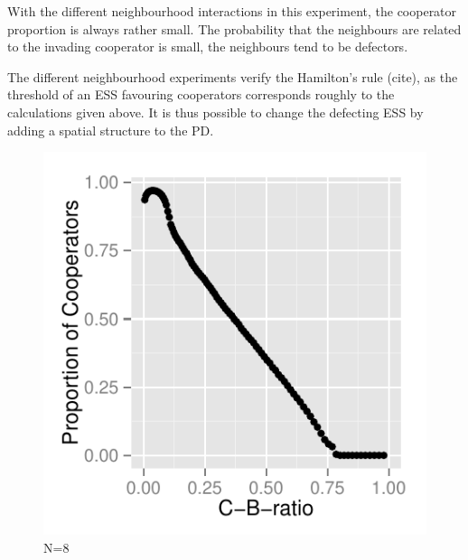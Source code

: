 \documentclass[DIV=calc, paper=a4, fontsize=11pt, twocolumn]{scrartcl}	 %
\begin{document}
With the different neighbourhood interactions in this experiment, the cooperator proportion is always rather small. The probability that the neighbours are related to the invading cooperator is small, the neighbours tend to be defectors. 

The different neighbourhood experiments verify the Hamilton's rule (cite), as the threshold of an ESS favouring cooperators corresponds roughly to the calculations given above. It is thus possible to change the defecting ESS by adding a spatial structure to the PD. \\

\begin{figure}[here]
\centering
\begin{minipage}{.35\textwidth}
  \centering
  \includegraphics[width=1\linewidth]{HDN8}
 \caption{N=8}
\label{fig:HDm1}
\end{minipage}%
\end{figure}
\end{document}
